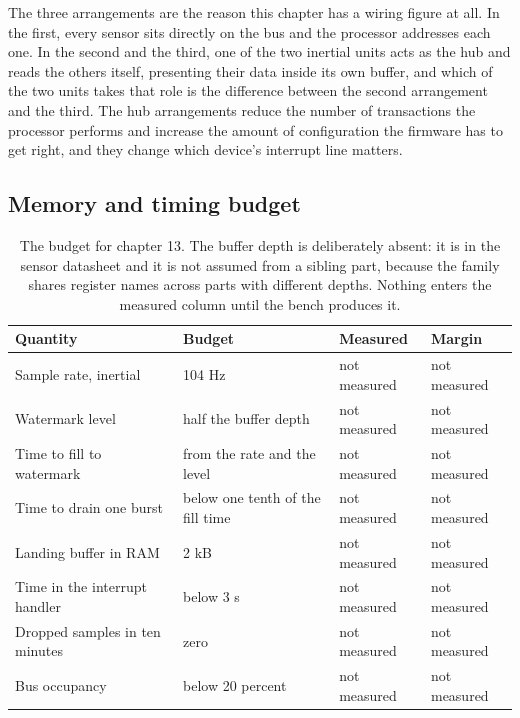 The three arrangements are the reason this chapter has a wiring figure at all.
In the first, every sensor sits directly on the bus and the processor addresses
each one. In the second and the third, one of the two inertial units acts as the
hub and reads the others itself, presenting their data inside its own buffer,
and which of the two units takes that role is the difference between the second
arrangement and the third. The hub arrangements reduce the number of
transactions the processor performs and increase the amount of configuration the
firmware has to get right, and they change which device's interrupt line
matters.

\subsection*{Memory and timing budget}


\begin{table}[H]\centering\small
\begin{tabular}{p{44mm}p{28mm}p{28mm}p{30mm}}
\toprule
Quantity & Budget & Measured & Margin \\
\midrule
Sample rate, inertial & 104 Hz & not measured & not measured \\
Watermark level & half the buffer depth & not measured & not measured \\
Time to fill to watermark & from the rate and the level & not measured & not measured \\
Time to drain one burst & below one tenth of the fill time & not measured & not measured \\
Landing buffer in RAM & 2 kB & not measured & not measured \\
Time in the interrupt handler & below 3 \textmu{}s & not measured & not measured \\
Dropped samples in ten minutes & zero & not measured & not measured \\
Bus occupancy & below 20 percent & not measured & not measured \\
\bottomrule
\end{tabular}
\caption{The budget for chapter 13. The buffer depth is deliberately absent: it is in the sensor datasheet and it is not assumed from a sibling part, because the family shares register names across parts with different depths. Nothing enters the measured column until the bench produces it.}
\end{table}

